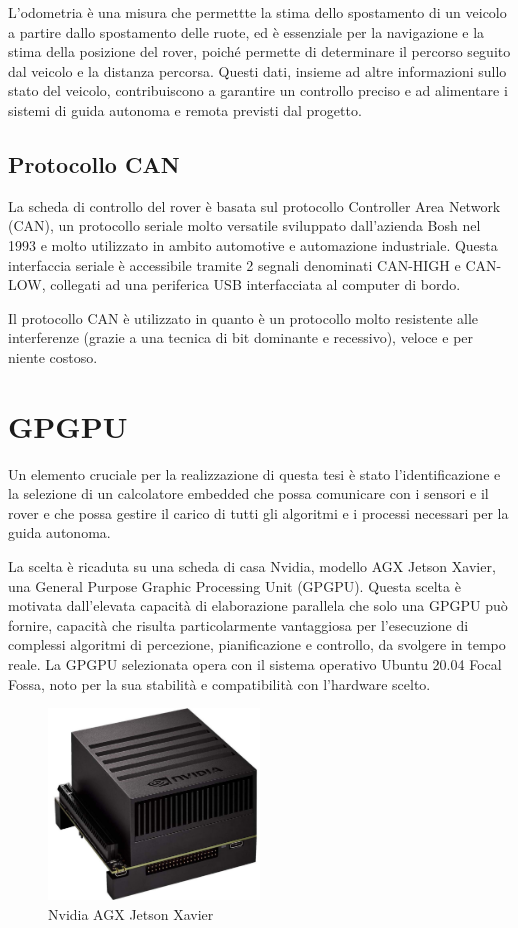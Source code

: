 \noindent L'odometria è una misura che permettte la stima dello spostamento di un veicolo a partire dallo spostamento delle ruote, ed è essenziale per la navigazione e la stima della posizione del rover, poiché permette di determinare il percorso seguito dal veicolo e la distanza percorsa. Questi dati, insieme ad altre informazioni sullo stato del veicolo, contribuiscono a garantire un controllo preciso e ad alimentare i sistemi di guida autonoma e remota previsti dal progetto.

\subsection{Protocollo CAN}
La scheda di controllo del rover è basata sul protocollo Controller Area Network (CAN), un protocollo seriale molto versatile sviluppato dall'azienda Bosh nel 1993 e molto utilizzato in ambito automotive e automazione industriale. Questa interfaccia seriale è accessibile tramite 2 segnali denominati CAN-HIGH e CAN-LOW, collegati ad una periferica USB interfacciata al computer di bordo.

\noindent Il protocollo CAN è utilizzato in quanto è un protocollo molto resistente alle interferenze (grazie a una tecnica di bit dominante e recessivo), veloce e per niente costoso.  

\section{GPGPU}
Un elemento cruciale per la realizzazione di questa tesi è stato l'identificazione e la selezione di un calcolatore embedded che possa comunicare con i sensori e il rover e che possa gestire il carico di tutti gli algoritmi e i processi necessari per la guida autonoma.

\noindent La scelta è ricaduta su una scheda di casa Nvidia, modello AGX Jetson Xavier, una  General Purpose Graphic Processing Unit (GPGPU). Questa scelta è motivata dall'elevata capacità di elaborazione parallela che solo una GPGPU può fornire, capacità che risulta particolarmente vantaggiosa per l'esecuzione di complessi algoritmi di percezione, pianificazione e controllo, da svolgere in tempo reale. La GPGPU selezionata opera con il sistema operativo Ubuntu 20.04 Focal Fossa, noto per la sua stabilità e compatibilità con l'hardware scelto.

\begin{figure}[h]
  \centering
  \includegraphics[width=0.5\textwidth]{figures/xavier.jpg}
  \caption{Nvidia AGX Jetson Xavier}
  \label{Nvidia AGX Jetson Xavier}
\end{figure}

